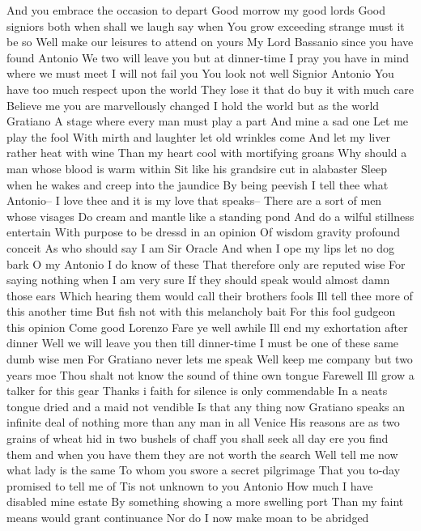 And you embrace the occasion to depart 
Good morrow my good lords 
Good signiors both when shall we laugh say when 
You grow exceeding strange must it be so 
Well make our leisures to attend on yours 
My Lord Bassanio since you have found Antonio 
We two will leave you but at dinner-time 
I pray you have in mind where we must meet 
I will not fail you 
You look not well Signior Antonio 
You have too much respect upon the world 
They lose it that do buy it with much care 
Believe me you are marvellously changed 
I hold the world but as the world Gratiano 
A stage where every man must play a part 
And mine a sad one 
Let me play the fool 
With mirth and laughter let old wrinkles come 
And let my liver rather heat with wine 
Than my heart cool with mortifying groans 
Why should a man whose blood is warm within 
Sit like his grandsire cut in alabaster 
Sleep when he wakes and creep into the jaundice 
By being peevish I tell thee what Antonio-- 
I love thee and it is my love that speaks-- 
There are a sort of men whose visages 
Do cream and mantle like a standing pond 
And do a wilful stillness entertain 
With purpose to be dressd in an opinion 
Of wisdom gravity profound conceit 
As who should say I am Sir Oracle 
And when I ope my lips let no dog bark 
O my Antonio I do know of these 
That therefore only are reputed wise 
For saying nothing when I am very sure 
If they should speak would almost damn those ears 
Which hearing them would call their brothers fools 
Ill tell thee more of this another time 
But fish not with this melancholy bait 
For this fool gudgeon this opinion 
Come good Lorenzo Fare ye well awhile 
Ill end my exhortation after dinner 
Well we will leave you then till dinner-time 
I must be one of these same dumb wise men 
For Gratiano never lets me speak 
Well keep me company but two years moe 
Thou shalt not know the sound of thine own tongue 
Farewell Ill grow a talker for this gear 
Thanks i faith for silence is only commendable 
In a neats tongue dried and a maid not vendible 
Is that any thing now 
Gratiano speaks an infinite deal of nothing more 
than any man in all Venice His reasons are as two 
grains of wheat hid in two bushels of chaff you 
shall seek all day ere you find them and when you 
have them they are not worth the search 
Well tell me now what lady is the same 
To whom you swore a secret pilgrimage 
That you to-day promised to tell me of 
Tis not unknown to you Antonio 
How much I have disabled mine estate 
By something showing a more swelling port 
Than my faint means would grant continuance 
Nor do I now make moan to be abridged 
